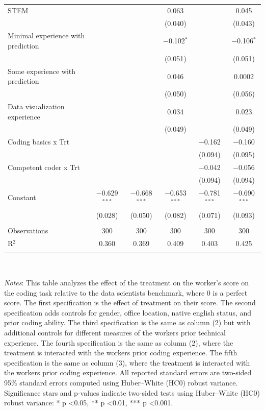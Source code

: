 \begin{table}[!htbp]
\begin{tabular}{@{\extracolsep{-5pt}}lccccc}
  STEM &  &  & 0.063 &  & 0.045 \\ 
  &  &  & (0.040) &  & (0.043) \\ 
  Minimal experience with prediction &  &  & $-$0.102$^{*}$ &  & $-$0.106$^{*}$ \\ 
  &  &  & (0.051) &  & (0.051) \\ 
  Some experience with prediction &  &  & 0.046 &  & 0.0002 \\ 
  &  &  & (0.050) &  & (0.056) \\ 
  Data visualization experience &  &  & 0.034 &  & 0.023 \\ 
  &  &  & (0.049) &  & (0.049) \\ 
  Coding basics x Trt &  &  &  & $-$0.162 & $-$0.160 \\ 
  &  &  &  & (0.094) & (0.095) \\ 
  Competent coder x Trt &  &  &  & $-$0.042 & $-$0.056 \\ 
  &  &  &  & (0.094) & (0.094) \\ 
  Constant & $-$0.629$^{***}$ & $-$0.668$^{***}$ & $-$0.653$^{***}$ & $-$0.781$^{***}$ & $-$0.690$^{***}$ \\ 
  & (0.028) & (0.050) & (0.082) & (0.071) & (0.093) \\ 
 \hline \\[-1.8ex] 
Observations & 300 & 300 & 300 & 300 & 300 \\ 
R$^{2}$ & 0.360 & 0.369 & 0.409 & 0.403 & 0.425 \\ 
\hline 
\hline \\[-1.8ex] 
\end{tabular}
\\
\begin{minipage}{\textwidth}
{\footnotesize \emph{Notes}: This table analyzes the effect of the treatment on the worker's score on the coding task relative to the data scientists benchmark, where 0 is a perfect score. The first specification is the effect of treatment on their score. The second specification adds controls for gender, office location, native english status, and prior coding ability. The third specification is the same as column (2) but with additional controls for different measures of the workers prior technical experience. The fourth specification is the same as column (2), where the treatment is interacted with the workers prior coding experience. The fifth specification is the same as column (3), where the treatment is interacted with the workers prior coding experience. All reported standard errors are two-sided 95\% standard errors computed using Huber--White (HC0) robust variance. Significance stars and p-values indicate two-sided tests using Huber--White (HC0) robust variance: * p \textless 0.05, ** p \textless 0.01, *** p \textless 0.001.}
\end{minipage}
\end{table}
